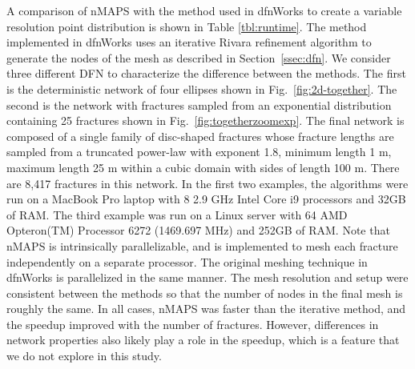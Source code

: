\documentclass[preprint, 10pt]{elsarticle}
\theoremstyle{definition}
\theoremstyle{remark}
\begin{document}
A comparison of nMAPS with the method used in {\sc dfnWorks} \cite{hyman2015dfnWorks} to create a variable resolution point distribution is shown in Table \ref{tbl:runtime}. 
The method implemented in {\sc dfnWorks} uses an iterative Rivara refinement algorithm to generate the nodes of the mesh as described in Section~\ref{ssec:dfn}.
We consider three different DFN to characterize the difference between the methods. 
The first is the deterministic network of four ellipses shown in Fig.~\ref{fig:2d-together}.
The second is the network with fractures sampled from an exponential distribution containing 25 fractures shown in Fig.~\ref{fig:togetherzoomexp}.
The final network is composed of a single family of disc-shaped fractures whose fracture lengths are sampled from a truncated power-law with exponent 1.8, minimum length 1 m, maximum length 25 m within a cubic domain with sides of length 100 m. 
There are 8,417 fractures in this network.
In the first two examples, the algorithms were run on a MacBook Pro laptop with 8 2.9 GHz Intel Core i9 processors and 32GB of RAM.
The third example was run on a Linux server with 64 AMD Opteron(TM) Processor 6272 (1469.697 MHz) and 252GB of RAM.
Note that nMAPS is intrinsically parallelizable, and is implemented to mesh each fracture independently on a separate processor. 
The original meshing technique in {\sc dfnWorks} is parallelized in the same manner.  
The mesh resolution and setup were consistent between the methods so that the number of nodes in the final mesh is roughly the same.
In all cases, nMAPS was faster than the iterative method, and the speedup improved with the number of fractures. 
However, differences in network properties also likely play a role in the speedup, which is a feature that we do not explore in this study. 
\end{document}
